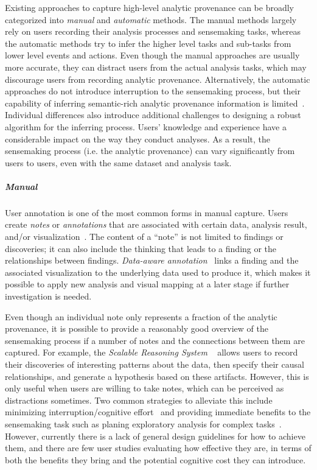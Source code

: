 Existing approaches to capture high-level analytic provenance can be broadly categorized into \emph{manual} and \emph{automatic} methods. The manual methods largely rely on users recording their analysis processes and sensemaking tasks, whereas the automatic methods try to infer the higher level tasks and sub-tasks from lower level events and actions. Even though the manual approaches are usually more accurate, they can distract users from the actual analysis tasks, which may discourage users from recording analytic provenance. Alternatively, the automatic approaches do not introduce interruption to the sensemaking process, but their capability of inferring semantic-rich analytic provenance information is limited~\cite{Gotz2009}. Individual differences also introduce additional challenges to designing a robust algorithm for the inferring process. Users' knowledge and experience have a considerable impact on the way they conduct analyses. As a result, the sensemaking process (i.e. the analytic provenance) can vary significantly from users to users, even with the same dataset and analysis task. 

\subparagraph{Manual}
User annotation is one of the most common forms in manual capture. Users create \emph{notes} or \emph{annotations} that are associated with certain data, analysis result, and/or visualization~\cite{Heer2009,Walker2013}. The content of a ``note'' is not limited to findings or discoveries; it can also include the thinking that leads to a finding or the relationships between findings. \emph{Data-aware annotation}~\cite{Heer2008a} links a finding and the associated visualization to the underlying data used to produce it, which makes it possible to apply new analysis and visual mapping at a later stage if further investigation is needed. 

Even though an individual note only represents a fraction of the analytic provenance, it is possible to provide a reasonably good overview of the sensemaking process if a number of notes and the connections between them are captured. For example, the \emph{Scalable Reasoning System} ~\cite{Pike2009} allows users to record their discoveries of interesting patterns about the data, then specify their causal relationships, and generate a hypothesis based on these artifacts. However, this is only useful when users are willing to take notes, which can be perceived as distractions sometimes. Two common strategies to alleviate this include minimizing interruption/cognitive effort~\cite{Hong2008} and providing immediate benefits to the sensemaking task such as planing exploratory analysis for complex tasks~\cite{Lunzer2014}. However, currently there is a lack of general design guidelines for how to achieve them, and there are few user studies evaluating how effective they are, in terms of both the benefits they bring and the potential cognitive cost they can introduce. 

